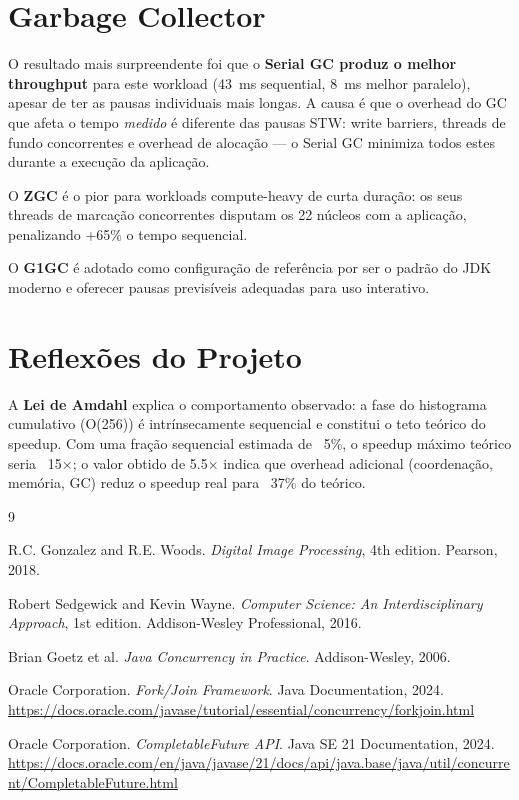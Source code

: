 \documentclass[a4paper,11pt,openright,BCOR=15mm]{scrbook}
\begin{document}
\section{Garbage Collector}

O resultado mais surpreendente foi que o \textbf{Serial GC produz o melhor throughput} para este workload (43~ms sequential, 8~ms melhor paralelo), apesar de ter as pausas individuais mais longas. A causa é que o overhead do GC que afeta o tempo \emph{medido} é diferente das pausas STW: write barriers, threads de fundo concorrentes e overhead de alocação --- o Serial GC minimiza todos estes durante a execução da aplicação.

O \textbf{ZGC} é o pior para workloads compute-heavy de curta duração: os seus threads de marcação concorrentes disputam os 22 núcleos com a aplicação, penalizando +65\% o tempo sequencial.

O \textbf{G1GC} é adotado como configuração de referência por ser o padrão do JDK moderno e oferecer pausas previsíveis adequadas para uso interativo.

\section{Reflexões do Projeto}

A \textbf{Lei de Amdahl} explica o comportamento observado: a fase do histograma cumulativo (O(256)) é intrínsecamente sequencial e constitui o teto teórico do speedup. Com uma fração sequencial estimada de ~5\%, o speedup máximo teórico seria ~15×; o valor obtido de 5.5× indica que overhead adicional (coordenação, memória, GC) reduz o speedup real para ~37\% do teórico.


\renewcommand\bibname{Referências}

\begin{thebibliography}{9}

R.C. Gonzalez and R.E. Woods.
\newblock \textit{Digital Image Processing}, 4th edition.
\newblock Pearson, 2018.

Robert Sedgewick and Kevin Wayne.
\newblock \textit{Computer Science: An Interdisciplinary Approach}, 1st edition.
\newblock Addison-Wesley Professional, 2016.

Brian Goetz et al.
\newblock \textit{Java Concurrency in Practice}.
\newblock Addison-Wesley, 2006.

Oracle Corporation.
\newblock \textit{Fork/Join Framework}.
\newblock Java Documentation, 2024.
\newblock \url{https://docs.oracle.com/javase/tutorial/essential/concurrency/forkjoin.html}

Oracle Corporation.
\newblock \textit{CompletableFuture API}.
\newblock Java SE 21 Documentation, 2024.
\newblock \url{https://docs.oracle.com/en/java/javase/21/docs/api/java.base/java/util/concurrent/CompletableFuture.html}

\end{thebibliography}

\label{references}
\end{document}
